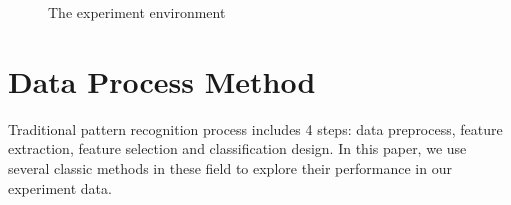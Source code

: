 \documentclass[runningheads,a4paper]{llncs}
\begin{document}
\begin{figure}
  \centering
  \hspace{0.5in}

  \hspace{0.5in}
  \caption{The experiment environment}
  \label{fig:experiment} %
\end{figure}

\section{Data Process Method}
Traditional pattern recognition process includes 4 steps: data preprocess,
feature extraction, feature selection and classification design. In this paper,
we use several classic methods in these field to explore their performance in
our experiment data.
\end{document}
